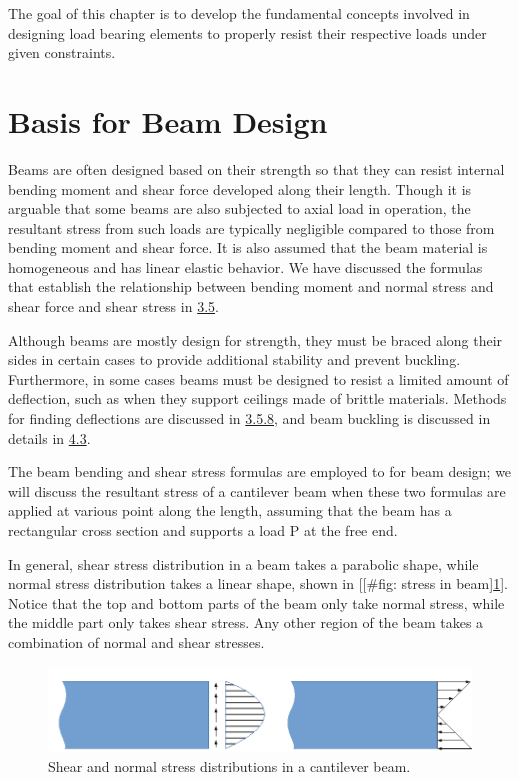 \documentclass[a4paper,openany,12pt]{book}
\begin{document}
{{The goal of this chapter is to develop the fundamental concepts involved
in designing load bearing elements to properly resist their respective
loads under given constraints.

\section{Basis for Beam Design}
\label{sec:orgccf212c}
Beams are often designed based on their strength so that they can resist
internal bending moment and shear force developed along their length.
Though it is arguable that some beams are also subjected to axial load
in operation, the resultant stress from such loads are typically
negligible compared to those from bending moment and shear force. It is
also assumed that the beam material is homogeneous and has linear
elastic behavior. We have discussed the formulas that establish the
relationship between bending moment and normal stress and shear force
and shear stress in \hyperref[sec:org58298b3]{3.5}.

Although beams are mostly design for strength, they must be braced along
their sides in certain cases to provide additional stability and prevent
buckling. Furthermore, in some cases beams must be designed to resist a
limited amount of deflection, such as when they support ceilings made of
brittle materials. Methods for finding deflections are discussed in
\hyperref[sec:org49fb7ee]{3.5.8}, and beam buckling is discussed
in details in \hyperref[sec:orga5a5e81]{4.3}.

The beam bending and shear stress formulas are employed to for beam
design; we will discuss the resultant stress of a cantilever beam when
these two formulas are applied at various point along the length,
assuming that the beam has a rectangular cross section and supports a
load P at the free end.

In general, shear stress distribution in a beam takes a parabolic shape,
while normal stress distribution takes a linear shape, shown in
[[\#fig: stress in beam]\ref{fig:org9c7e60a}]. Notice that the top and
bottom parts of the beam only take normal stress, while the middle part
only takes shear stress. Any other region of the beam takes a
combination of normal and shear stresses.


\begin{figure}[htbp]
\centering
\includegraphics[width=.9\linewidth]{pictures/Simple-load-bearing/stress-in-beam.pdf}
\caption{\label{fig:org9c7e60a}
Shear and normal stress distributions in a cantilever beam.}
\end{figure}

}}
\end{document}
